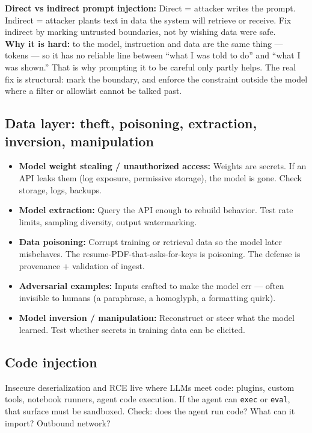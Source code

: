 \begin{defbox}
\textbf{Direct vs indirect prompt injection:} Direct = attacker writes the prompt. Indirect = attacker plants text in data the system will retrieve or receive. Fix indirect by marking untrusted boundaries, not by wishing data were safe.\\
\textbf{Why it is hard:} to the model, instruction and data are the same thing — tokens — so it has no reliable line between ``what I was told to do'' and ``what I was shown.'' That is why prompting it to be careful only partly helps. The real fix is structural: mark the boundary, and enforce the constraint outside the model where a filter or allowlist cannot be talked past.
\end{defbox}

\subsection{Data layer: theft, poisoning, extraction, inversion, manipulation}
\begin{itemize}
\item \textbf{Model weight stealing / unauthorized access:} Weights are secrets. If an API leaks them (log exposure, permissive storage), the model is gone. Check storage, logs, backups.
\item \textbf{Model extraction:} Query the API enough to rebuild behavior. Test rate limits, sampling diversity, output watermarking.
\item \textbf{Data poisoning:} Corrupt training or retrieval data so the model later misbehaves. The resume-PDF-that-asks-for-keys is poisoning. The defense is provenance + validation of ingest.
\item \textbf{Adversarial examples:} Inputs crafted to make the model err — often invisible to humans (a paraphrase, a homoglyph, a formatting quirk).
\item \textbf{Model inversion / manipulation:} Reconstruct or steer what the model learned. Test whether secrets in training data can be elicited.
\end{itemize}

\subsection{Code injection}
Insecure deserialization and RCE live where LLMs meet code: plugins, custom tools, notebook runners, agent code execution. If the agent can \texttt{exec} or \texttt{eval}, that surface must be sandboxed. Check: does the agent run code? What can it import? Outbound network?

